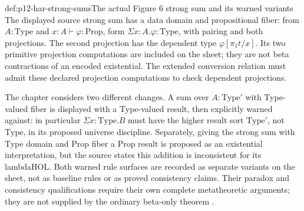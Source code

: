 \begin{hbdefinition}{def:p12-har-strong-sums}{The actual Figure 6 strong sum and its warned variants}
The displayed source strong sum has a data domain and propositional
fiber: from \(A:\mathrm{Type}\) and
\(x:A\vdash\varphi:\mathrm{Prop}\), form
\(\Sigma x:A.\varphi:\mathrm{Type}\), with pairing and
both projections. The second projection has the dependent type
\(\varphi[\pi_1t/x]\). Its two primitive projection computations
are included on the sheet; they are not beta contractions of an encoded
existential. The extended conversion relation must admit these declared
projection computations to check dependent projections.

The chapter considers two different changes. A sum over
\(A:\mathrm{Type}'\) with Type-valued fiber is displayed with
a Type-valued result, then explicitly warned against: in particular
\(\Sigma x:\mathrm{Type}.B\) must have the higher result sort
\(\mathrm{Type}'\), not \(\mathrm{Type}\), in its proposed
universe discipline. Separately, giving the strong sum with Type domain
and Prop fiber a Prop result is proposed as an existential interpretation,
but the source states this addition is inconsistent for its lambdaHOL.
Both warned rule surfaces are recorded as separate variants on the sheet,
not as baseline rules or as proved consistency claims. Their paradox and
consistency qualifications require their own complete metatheoretic
arguments; they are not supplied by the ordinary beta-only theorem
\cite[pp.~1204--1206, Fig.~6]{BarendregtGeuvers2001}.
\end{hbdefinition}

